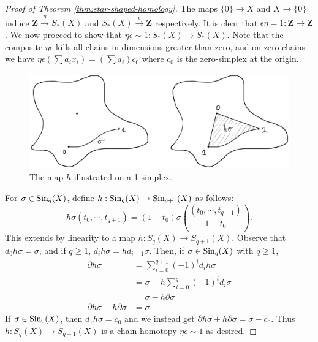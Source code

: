\begin{proof}[Proof of Theorem \ref{thm:star-shaped-homology}]
	The maps $\{0\}\to X$ and $X\to \{0\}$ induce $\mathbf{Z}\xrightarrow{\eta}S_\ast(X)$ and $S_\ast(X)\xrightarrow{\epsilon}\mathbf{Z}$ respectively. It is clear that $\epsilon\eta = 1:\mathbf{Z}\to\mathbf{Z}$. We now proceed to show that $\eta\epsilon\sim 1:S_\ast(X)\to S_\ast(X)$. Note that the composite $\eta \epsilon$ kills all chains in dimensions greater than zero, and on zero-chains we have $\eta\epsilon(\sum a_ix_i)=(\sum a_i)c_0$ where $c_0$ is the zero-simplex at the origin.
	
\begin{figure}[H]
	\centering
	\includegraphics[width=0.8\linewidth]{assets/L05/05-star-shaped-line-homotopy-pf}
	\caption{The map $h$ illustrated on a 1-simplex.}
	\label{fig:05-star-shaped-line-homotopy-pf}
\end{figure}
	
	For $\sigma\in\mathrm{Sin}_q(X)$, define $h:\mathrm{Sin}_q(X)\to\mathrm{Sin}_{q+1}(X)$ as follows:
	$$h\sigma(t_0,\cdots,t_{q+1})=(1-t_0)\sigma\left(\frac{(t_0,\cdots,t_{q+1})}{1-t_0}\right).$$
	This extends by linearity to a map $h:S_q(X)\to S_{q+1}(X)$.
	Observe that $d_0 h \sigma = \sigma$, and if $q \geq 1$, $d_i h \sigma = h d_{i-1} \sigma$. Then, if $\sigma \in \mathrm{Sin}_q(X)$ with $q \geq 1$,
	\begin{align*}
		\partial h \sigma &= \sum_{i=0}^{q+1} (-1)^{i} d_i h\sigma\\
		&= \sigma - h \sum_{i=0}^q (-1)^i d_i \sigma\\
		&= \sigma - h\partial \sigma\\
		\partial h \sigma + h \partial \sigma &= \sigma.
	\end{align*}
	If $\sigma \in \mathrm{Sin}_0(X)$, then $d_1 h \sigma = c_0$ and we instead get $\partial h \sigma + h \partial \sigma = \sigma - c_0$. Thus $h:S_q(X)\to S_{q+1}(X)$ is a chain homotopy $\eta \epsilon \sim 1$ as desired.
\end{proof}
